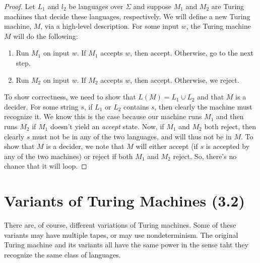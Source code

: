 \documentclass[letterpaper]{article}
\begin{document}
\begin{mdframed}[]
    \begin{proof}
        Let $L_1$ and $l_2$ be languages over $\Sigma$ and suppose $M_1$ and $M_2$ are Turing machines that decide these languages, respectively. We will define a new Turing machine, $M$, via a high-level description. For some input $w$, the Turing machine $M$ will do the following: 
        \begin{enumerate}
            \item Run $M_1$ on input $w$. If $M_1$ accepts $w$, then accept. Otherwise, go to the next step. 
            \item Run $M_2$ on input $w$. If $M_2$ accepts $w$, then accept. Otherwise, we reject. 
        \end{enumerate} 
        To show correctness, we need to show that $L(M) = L_1 \cup L_2$ and that $M$ is a decider. For some string $s$, if $L_1$ or $L_2$ contains $s$, then clearly the machine must recognize it. We know this is the case because our machine runs $M_1$ and then runs $M_2$ if $M_1$ doesn't yield an \emph{accept} state. Now, if $M_1$ and $M_2$ both reject, then clearly $s$ must not be in any of the two languages, and will thus not be in $M$. To show that $M$ is a decider, we note that $M$ will either accept (if $s$ is accepted by any of the two machines) or reject if both $M_1$ and $M_2$ reject. So, there's no chance that it will loop.  
    \end{proof}
\end{mdframed}







\newpage 
\section{Variants of Turing Machines (3.2)}
There are, of course, different variations of Turing machines. Some of these variants may have multiple tapes, or may use nondeterminism. The original Turing machine and its variants all have the same power in the sense taht they recognize the same class of languages. 
\end{document}

